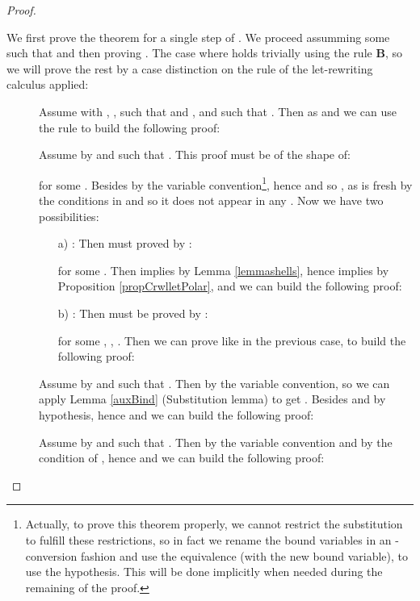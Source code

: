 \begin{proof}\label{DEMO_T27}


We first prove the theorem for a single step of . We proceed assumming some  such that 
and then proving . The case where  holds
trivially using the rule \textbf{B}, so we will prove the rest by a case distinction
on the rule of the let-rewriting calculus applied:
\begin{description}
\item[] Assume  with , , such that  and , and  such that . Then as  and  we can use the  rule to build the following proof:


\item[] Assume  by  and  such that . This proof must be of the shape of:

for some . Besides  by the variable convention\footnote{Actually, to prove this theorem properly, we cannot restrict the substitution to fulfill these restrictions, so in fact we rename the bound variables in an -conversion fashion and use the equivalence  (with  the new bound variable), to use the hypothesis. This will be done implicitly when needed during the remaining of the proof.}, hence  and so , as  is fresh by the conditions in  and so it does not appear in any . Now we have two possibilities:
\begin{enumerate}
\item[a)]  : Then  must proved by :

for some . Then  implies  by Lemma \ref{lemmashells}, hence  implies  by Proposition \ref{propCrwlletPolar}, and we can build the following proof: 

        \item[b)]  : Then  must be proved by :

for some , , .
Then we can prove  like in the previous case, to build the following proof:

\end{enumerate}

\item[] Assume  by  and  such that . Then  by the variable convention, so we can apply Lemma \ref{auxBind} (Substitution lemma) to get . Besides  and  by hypothesis, hence  and we can build the following proof:



\item[] Assume  by  and  such that . Then  by the variable convention and  by the condition of , hence  and we can build the following proof:




\end{description}
\end{proof}
